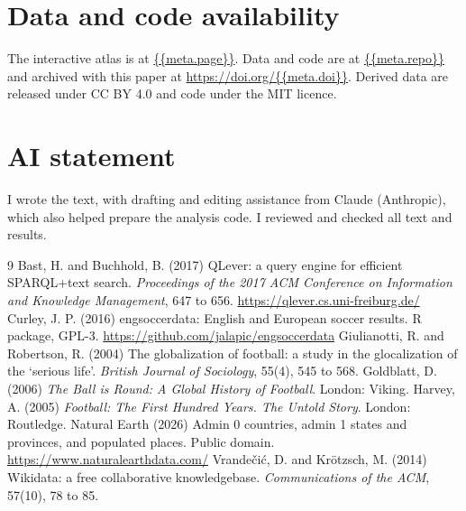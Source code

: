 \documentclass[11pt,a4paper]{article}
\begin{document}
\section*{Data and code availability}
The interactive atlas is at \url{{{meta.page}}}. Data and code are at \url{{{meta.repo}}} and archived with this paper at \url{https://doi.org/{{meta.doi}}}. Derived data are released under CC BY 4.0 and code under the MIT licence.

\section*{AI statement}
I wrote the text, with drafting and editing assistance from Claude (Anthropic), which also helped prepare the analysis code. I reviewed and checked all text and results.

\begin{thebibliography}{9}
 Bast, H. and Buchhold, B. (2017) QLever: a query engine for efficient SPARQL+text search. \emph{Proceedings of the 2017 ACM Conference on Information and Knowledge Management}, 647 to 656. \url{https://qlever.cs.uni-freiburg.de/}
 Curley, J. P. (2016) engsoccerdata: English and European soccer results. R package, GPL-3. \url{https://github.com/jalapic/engsoccerdata}
 Giulianotti, R. and Robertson, R. (2004) The globalization of football: a study in the glocalization of the `serious life'. \emph{British Journal of Sociology}, 55(4), 545 to 568.
 Goldblatt, D. (2006) \emph{The Ball is Round: A Global History of Football}. London: Viking.
 Harvey, A. (2005) \emph{Football: The First Hundred Years. The Untold Story}. London: Routledge.
 Natural Earth (2026) Admin 0 countries, admin 1 states and provinces, and populated places. Public domain. \url{https://www.naturalearthdata.com/}
 Vrandečić, D. and Krötzsch, M. (2014) Wikidata: a free collaborative knowledgebase. \emph{Communications of the ACM}, 57(10), 78 to 85.
\end{thebibliography}
\end{document}
